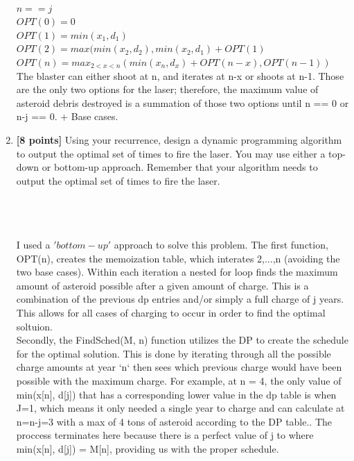 \documentclass[11pt]{article}
\theoremstyle{definition}
\theoremstyle{theorem}
\newcommand{\solution}{\medskip\noindent{\color{DarkBlue}\textbf{Solution:}}}
\begin{document}
\begin{enumerate}[label=(\alph*)]
\solution \\ 
$n == j $\\
$OPT(0) = 0$\\
$OPT(1) = min(x_1, d_1)$\\
$OPT(2) = max(min(x_2, d_2), min(x_2, d_1) + OPT(1)$\\
$OPT(n) = max_{2<x<n}(min(x_n,d_x) + OPT(n-x), OPT(n-1))$\\

The blaster can either shoot at n, and iterates at n-x or shoots at n-1. Those are the only two options for the laser; therefore, the maximum value of asteroid debris destroyed is a summation of those two options until n == 0 or n-j == 0. + Base cases.


\item  \textbf{[8 points]} Using your recurrence, design a dynamic programming algorithm to output the optimal set of times to fire the laser.  You may use either a top-down or bottom-up approach.  Remember that your algorithm needs to output the optimal set of times to fire the laser.

\solution \\ 

 \\\\

I used a $'bottom-up'$ approach to solve this problem. The first function, OPT(n), creates the memoization table, which interates 2,...,n (avoiding the two base cases). Within each iteration a nested for loop finds the maximum amount of asteroid possible after a given amount of charge. This is a combination of the previous dp entries and/or simply a full charge of j years. This allows for all cases of charging to occur in order to find the optimal soltuion. \\

Secondly, the FindSched(M, n) function utilizes the DP to create the schedule for the optimal solution. This is done by iterating through all the possible charge amounts at year `n` then sees which previous charge would have been possible with the maximum charge.
For example, at n = 4, the only value of min(x[n], d[j]) that has a corresponding lower value in the dp table is when J=1, which means it only needed a single year to charge and can calculate at n=n-j=3 with a max of 4 tons of asteroid according to the DP table.. The proccess terminates here because there is a perfect value of j to where min(x[n], d[j]) = M[n], providing us with the proper schedule.


\end{enumerate}
\end{document}
